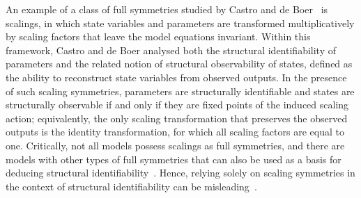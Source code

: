 \documentclass[12pt]{article}
\begin{document}
An example of a class of full symmetries studied by Castro and de Boer~\cite{castro2020structuralIdentifiability} is scalings, in which state variables and parameters are transformed multiplicatively by scaling factors that leave the model equations invariant. Within this framework, Castro and de Boer analysed both the structural identifiability of parameters and the related notion of structural observability of states, defined as the ability to reconstruct state variables from observed outputs. In the presence of such scaling symmetries, parameters are structurally identifiable and states are structurally observable if and only if they are fixed points of the induced scaling action; equivalently, the only scaling transformation that preserves the observed outputs is the identity transformation, for which all scaling factors are equal to one. Critically, not all models possess scalings as full symmetries, and there are models with other types of full symmetries that can also be used as a basis for deducing structural identifiability~\cite{villaverde2021testing}. Hence, relying solely on scaling symmetries in the context of structural identifiability can be misleading~\cite{villaverde2021testing}.
\end{document}
